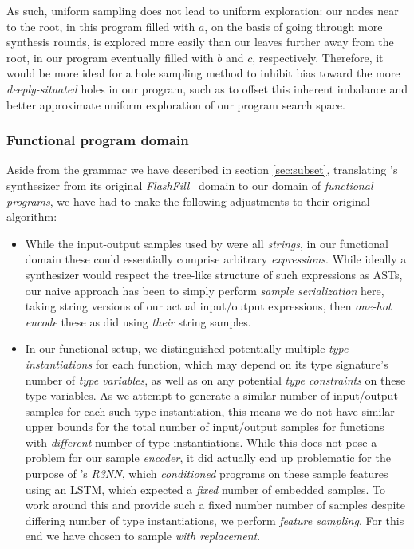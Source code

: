 \documentclass{article}
\begin{document}
As such, uniform sampling does not lead to uniform exploration:
our nodes near to the root, in this program filled with $a$,
on the basis of going through more synthesis rounds,
is explored more easily than our leaves further away from the root,
in our program eventually filled with $b$ and $c$, respectively.
Therefore, it would be more ideal for a hole sampling method to inhibit
bias toward the more \emph{deeply-situated} holes in our program,
such as to offset this inherent imbalance and better approximate
uniform exploration of our program search space.


\subsubsection{Functional program domain}

Aside from the grammar we have described in section \ref{sec:subset},
translating \citet{nsps}'s synthesizer from its original \emph{FlashFill}~\citep{prose} domain to our domain of \emph{functional programs},
we have had to make the following adjustments to their original algorithm:
\begin{itemize}
    \item While the input-output samples used by \citet{nsps} were all \emph{strings},
    in our functional domain these could essentially comprise arbitrary \emph{expressions}.
    While ideally a synthesizer would respect the tree-like structure of such expressions as ASTs,
    our naive approach has been to simply perform \emph{sample serialization} here,
    taking string versions of our actual input/output expressions,
    then \emph{one-hot encode} these as \citet{nsps} did using \emph{their} string samples.
    \item In our functional setup,
    we distinguished potentially multiple \emph{type instantiations} for each function,
    which may depend on its type signature's number of \emph{type variables},
    as well as on any potential \emph{type constraints} on these type variables.
    As we attempt to generate a similar number of input/output samples for each such type instantiation,
    this means we do not have similar upper bounds for the total number of input/output samples for functions with \emph{different} number of type instantiations.
    While this does not pose a problem for our sample \emph{encoder},
    it did actually end up problematic for the purpose of \citet{nsps}'s \emph{R3NN},
    which \emph{conditioned} programs on these sample features using an LSTM,
    which expected a \emph{fixed} number of embedded samples.
    To work around this and provide such a fixed number number of samples despite differing number of type instantiations,
    we perform \emph{feature sampling}.
    For this end we have chosen to sample \emph{with replacement}.
\end{itemize}
\end{document}
